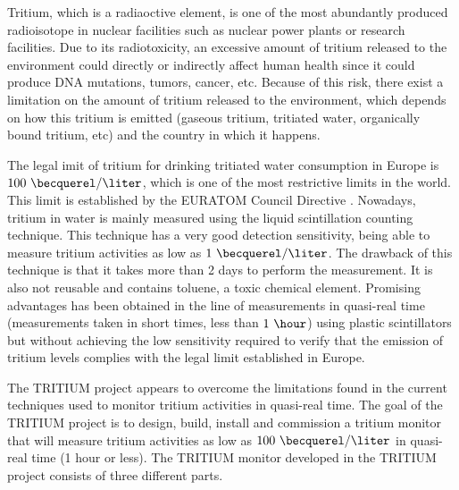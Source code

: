 Tritium, which is a radiaoctive element, is one of the most abundantly produced radioisotope in nuclear facilities such as nuclear power plants or research facilities. Due to its radiotoxicity, an excessive amount of tritium released to the environment could directly or indirectly affect human health since it could produce DNA mutations, tumors, cancer, etc. Because of this risk, there exist a limitation on the amount of tritium released to the environment, which depends on how this tritium is emitted (gaseous tritium, tritiated water, organically bound tritium, etc) and the country in which it happens.

The legal imit of tritium for drinking tritiated water consumption in Europe is $100~\becquerel/\liter$, which is one of the most restrictive limits in the world. This limit is established by the EURATOM Council Directive \cite{EURATOM_GL}. Nowadays, tritium in water is mainly measured using the liquid scintillation counting technique. This technique has a very good detection sensitivity, being able to measure tritium activities as low as $1~\becquerel/\liter$. The drawback of this technique is that it takes more than 2 days to perform the measurement. It is also not reusable and contains toluene, a toxic chemical element. Promising advantages has been obtained in the line of measurements in quasi-real time (measurements taken in short times, less than $1~\hour$) using plastic scintillators but without achieving the low sensitivity required to verify that the emission of tritium levels complies with the legal limit established in Europe.

The TRITIUM project appears to overcome the limitations found in the current techniques used to monitor tritium activities in quasi-real time. The goal of the TRITIUM project is to design, build, install and commission a tritium monitor that will measure tritium activities as low as $100~\becquerel/\liter$  in quasi-real time (1 hour or less). The TRITIUM monitor developed in the TRITIUM project consists of three different parts.

